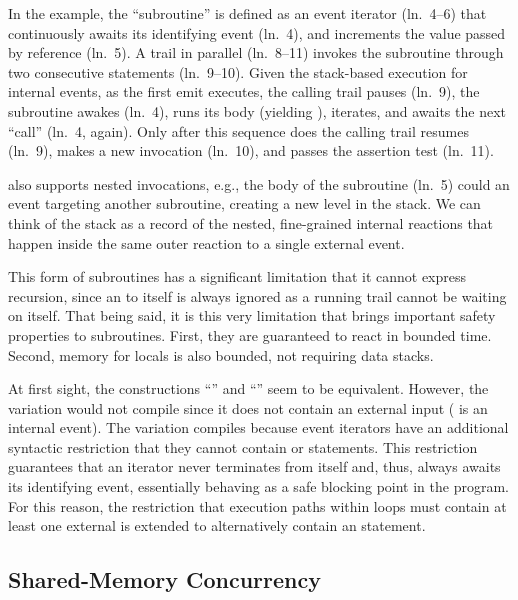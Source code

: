 In the example, the ``subroutine''  is defined as an event iterator
(ln.~4--6) that continuously awaits its identifying event (ln.~4), and
increments the value passed by reference (ln.~5).
%
A trail in parallel (ln.~8--11) invokes the subroutine through two consecutive
 statements (ln.~9--10).
%
Given the stack-based execution for internal events, as the first emit
executes, the calling trail pauses (ln.~9), the subroutine awakes (ln.~4), runs
its body (yielding ), iterates, and awaits the next ``call'' (ln.~4,
again).
%
Only after this sequence does the calling trail resumes (ln.~9), makes a new
invocation (ln.~10), and passes the assertion test (ln.~11).


\CEU also supports nested  invocations, e.g., the body of the
subroutine  (ln.~5) could  an event targeting another
subroutine, creating a new level in the stack.
%
We can think of the stack as a record of the nested, fine-grained internal
reactions that happen inside the same outer reaction to a single external
event.

This form of subroutines has a significant limitation that it cannot express
recursion, since an  to itself is always ignored as a running trail
cannot be waiting on itself.
%
That being said, it is this very limitation that brings important safety
properties to subroutines.
%
First, they are guaranteed to react in bounded time.
%
Second, memory for locals is also bounded, not requiring data stacks.

At first sight, the constructions ``'' and
``'' seem to be equivalent.
However, the  variation would not compile since it does not contain
an external input  ( is an internal event).
%
The  variation compiles because event iterators have an additional
syntactic restriction that they cannot contain  or 
statements.
This restriction guarantees that an iterator never terminates from itself and,
thus, always awaits its identifying event, essentially behaving as a safe
blocking point in the program.
%
For this reason, the restriction that execution paths within loops must
contain at least one external  is extended to alternatively contain
an  statement.

\subsection{Shared-Memory Concurrency}
\label{sec.ceu.shared}

